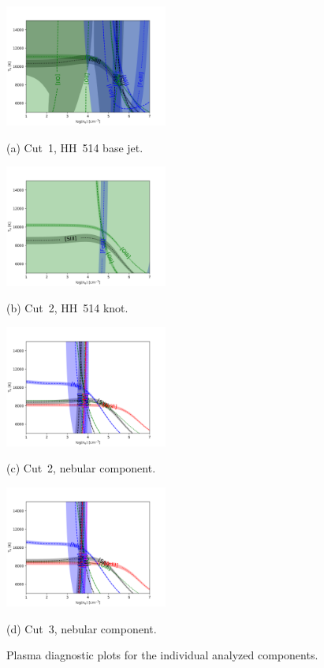 \documentclass[fleqn,usenatbib]{mnras}
\begin{document}
\begin{figure}
  \begin{minipage}{7.5cm}
    \centering\includegraphics[height=4cm,width=\columnwidth]{HH514I.png}
    \centerline{(a) Cut~1, HH~514 base jet.}
  \end{minipage}
  \begin{minipage}{7.5cm}
     \centering\includegraphics[height=4cm,width=\columnwidth]{HH514II.png}
    \centerline{(b) Cut~2, HH~514 knot.}
  \end{minipage}
 
  \begin{minipage}{7.5cm}
   \centering\includegraphics[height=4cm,width=\columnwidth]{neb_cut2.png}
   \centerline{(c) Cut~2, nebular component.}
  \end{minipage}
  \begin{minipage}{7.5cm}
    \centering\includegraphics[height=4cm,width=\columnwidth]{neb_cut3.png}
    \centerline{(d) Cut~3, nebular component.}
  \end{minipage}
  \caption{Plasma diagnostic plots for the individual analyzed components.}
\label{fig:plasma}
\end{figure}
\end{document}
